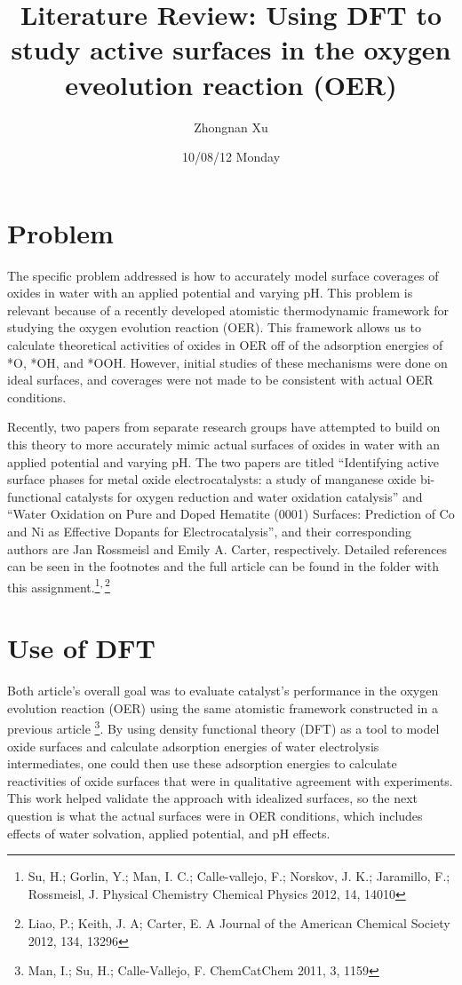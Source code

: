 \documentclass[11pt]{article}
\title{Literature Review: Using DFT to study active surfaces in the oxygen eveolution reaction (OER)}
\author{Zhongnan Xu}
\date{10/08/12 Monday}
\begin{document}
\maketitle



\section*{Problem}
\label{sec-1}

The specific problem addressed is how to accurately model surface
coverages of oxides in water with an applied potential and varying
pH. 
This problem is relevant because of a recently developed atomistic 
thermodynamic framework for studying the oxygen evolution reaction
(OER).
This framework allows us to calculate theoretical activities of oxides in 
OER off of the adsorption energies of *O, *OH, and *OOH. 
However, initial studies of these mechanisms were done on ideal surfaces, and
coverages were not made to be consistent with actual OER conditions.

Recently, two papers from separate research groups have attempted to
build on this theory to more accurately mimic actual surfaces of
oxides in water with an applied potential and varying pH. 
The two papers are titled ``Identifying active surface phases for metal oxide
electrocatalysts: a study of manganese oxide bi-functional catalysts
for oxygen reduction and water oxidation catalysis'' and ``Water
Oxidation on Pure and Doped Hematite (0001) Surfaces: Prediction of Co
and Ni as Effective Dopants for Electrocatalysis'', and their
corresponding authors are Jan Rossmeisl and Emily A. Carter,
respectively.
Detailed references can be seen in the footnotes and the full article
can be found in the folder with this assignment.\footnote{Su, H.; Gorlin, Y.; Man, I. C.; Calle-vallejo, F.; Norskov, J. K.;
Jaramillo, F.; Rossmeisl, J. Physical Chemistry Chemical Physics 2012,
14, 14010
 }\textsuperscript{,}\,\footnote{Liao, P.; Keith, J. A; Carter, E. A Journal of the American Chemical
Society 2012, 134, 13296
 }
\section*{Use of DFT}
\label{sec-2}

Both article's overall goal was to evaluate catalyst's performance in
the oxygen evolution reaction (OER) using the same atomistic framework
constructed in a previous article \footnote{Man, I.; Su, H.; Calle-Vallejo, F. ChemCatChem 2011, 3, 1159
 }.
By using density functional theory (DFT) as a tool to model oxide
surfaces and calculate adsorption energies of water electrolysis
intermediates, one could then use these adsorption energies to
calculate reactivities of oxide surfaces that were in qualitative
agreement with experiments.
This work helped validate the approach with idealized surfaces, so the
next question is what the actual surfaces were in OER conditions,
which includes effects of water solvation, applied potential, and pH
effects.
\end{document}
